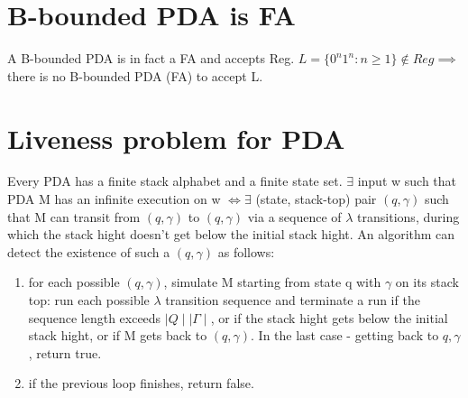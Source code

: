 \documentclass{article}
\begin{document}
\section{B-bounded PDA is FA}
A B-bounded PDA is in fact a FA and accepts Reg. $ L = \{0^n1^n: n \geq 1\} 
\notin Reg \implies$ there is no B-bounded PDA (FA) to accept L.

\section{Liveness problem for PDA}

Every PDA has a finite stack alphabet and a finite state set. $ \exists $ input w such that PDA M has an infinite execution on w $ \iff \exists $ (state, stack-top) pair $ (q, \gamma) $ such that M can transit from $ (q, \gamma) $ to $ (q, \gamma) $ via a sequence of $ \lambda $ transitions, during which the stack hight doesn't get below the initial stack hight. An algorithm can detect the existence of such a $ (q, \gamma) $ as follows:
\begin{enumerate}
	\item for each possible $ (q, \gamma) $, simulate M starting from state q with $ \gamma $ on its stack top: run each possible $ \lambda $ transition sequence and terminate a run if the sequence length exceeds $ \mid Q \mid \mid \Gamma \mid $, or if the stack hight gets below the initial stack hight, or if M gets back to $ (q, \gamma) $. In the last case - getting back to $ q, \gamma $, return true.
	\item if the previous loop finishes, return false.
\end{enumerate}
\end{document}
